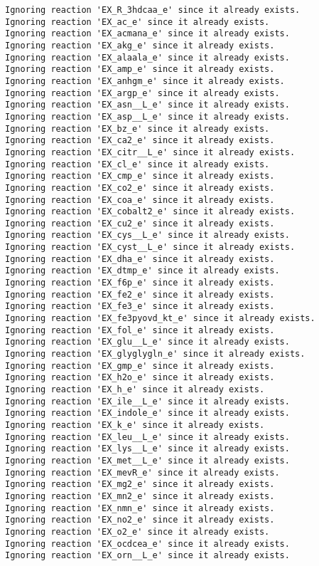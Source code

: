 \documentclass[
  letterpaper,
  DIV=11,
  numbers=noendperiod]{scrartcl}
\begin{document}
\begin{verbatim}
Ignoring reaction 'EX_R_3hdcaa_e' since it already exists.
Ignoring reaction 'EX_ac_e' since it already exists.
Ignoring reaction 'EX_acmana_e' since it already exists.
Ignoring reaction 'EX_akg_e' since it already exists.
Ignoring reaction 'EX_alaala_e' since it already exists.
Ignoring reaction 'EX_amp_e' since it already exists.
Ignoring reaction 'EX_anhgm_e' since it already exists.
Ignoring reaction 'EX_argp_e' since it already exists.
Ignoring reaction 'EX_asn__L_e' since it already exists.
Ignoring reaction 'EX_asp__L_e' since it already exists.
Ignoring reaction 'EX_bz_e' since it already exists.
Ignoring reaction 'EX_ca2_e' since it already exists.
Ignoring reaction 'EX_citr__L_e' since it already exists.
Ignoring reaction 'EX_cl_e' since it already exists.
Ignoring reaction 'EX_cmp_e' since it already exists.
Ignoring reaction 'EX_co2_e' since it already exists.
Ignoring reaction 'EX_coa_e' since it already exists.
Ignoring reaction 'EX_cobalt2_e' since it already exists.
Ignoring reaction 'EX_cu2_e' since it already exists.
Ignoring reaction 'EX_cys__L_e' since it already exists.
Ignoring reaction 'EX_cyst__L_e' since it already exists.
Ignoring reaction 'EX_dha_e' since it already exists.
Ignoring reaction 'EX_dtmp_e' since it already exists.
Ignoring reaction 'EX_f6p_e' since it already exists.
Ignoring reaction 'EX_fe2_e' since it already exists.
Ignoring reaction 'EX_fe3_e' since it already exists.
Ignoring reaction 'EX_fe3pyovd_kt_e' since it already exists.
Ignoring reaction 'EX_fol_e' since it already exists.
Ignoring reaction 'EX_glu__L_e' since it already exists.
Ignoring reaction 'EX_glyglygln_e' since it already exists.
Ignoring reaction 'EX_gmp_e' since it already exists.
Ignoring reaction 'EX_h2o_e' since it already exists.
Ignoring reaction 'EX_h_e' since it already exists.
Ignoring reaction 'EX_ile__L_e' since it already exists.
Ignoring reaction 'EX_indole_e' since it already exists.
Ignoring reaction 'EX_k_e' since it already exists.
Ignoring reaction 'EX_leu__L_e' since it already exists.
Ignoring reaction 'EX_lys__L_e' since it already exists.
Ignoring reaction 'EX_met__L_e' since it already exists.
Ignoring reaction 'EX_mevR_e' since it already exists.
Ignoring reaction 'EX_mg2_e' since it already exists.
Ignoring reaction 'EX_mn2_e' since it already exists.
Ignoring reaction 'EX_nmn_e' since it already exists.
Ignoring reaction 'EX_no2_e' since it already exists.
Ignoring reaction 'EX_o2_e' since it already exists.
Ignoring reaction 'EX_ocdcea_e' since it already exists.
Ignoring reaction 'EX_orn__L_e' since it already exists.

\end{verbatim}
\end{document}
